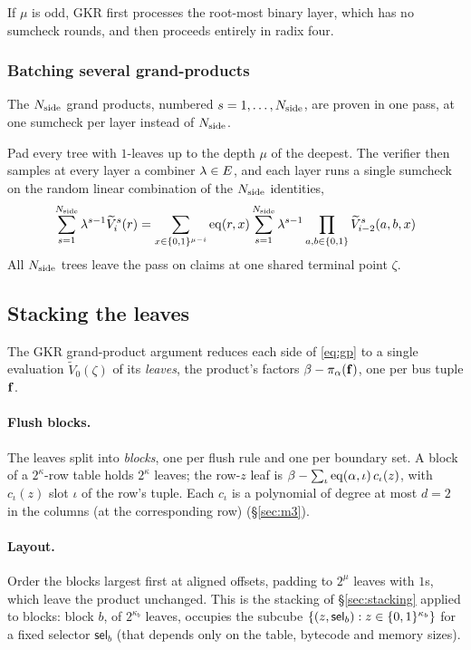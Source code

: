 If $\mu$ is odd, GKR first processes the root-most binary layer, which has no sumcheck rounds, and then proceeds entirely in radix four.

\subsubsection{Batching several grand-products}

The $N_{\mathrm{side}}$ grand products, numbered $s=1,\dots,N_{\mathrm{side}}$, are proven in one pass, at one sumcheck per layer instead of $N_{\mathrm{side}}$.

Pad every tree with $1$-leaves up to the depth $\mu$ of the deepest. The verifier then samples at every layer a combiner $\lambda \in E$, and each layer runs a single sumcheck on the random linear combination of the $N_{\mathrm{side}}$ identities,
\[
\sum_{s=1}^{N_{\mathrm{side}}}\lambda^{s-1}\widetilde V_i^{s}(r)=\sum_{x\in\{0,1\}^{\mu-i}}\operatorname{eq}(r,x)\sum_{s=1}^{N_{\mathrm{side}}}\lambda^{s-1}\prod_{a,b\in\{0,1\}}\widetilde V_{i-2}^{s}(a,b,x)
\]
All $N_{\mathrm{side}}$ trees leave the pass on claims at one shared terminal point $\zeta$.

\subsection{Stacking the leaves}\label{sec:leafstack}

The GKR grand-product argument reduces each side of \eqref{eq:gp} to a single evaluation $\widetilde V_0(\zeta)$ of its \emph{leaves}, the product's factors $\beta-\pi_\alpha(\mathbf{f})$, one per bus tuple $\mathbf{f}$.

\paragraph{Flush blocks.} The leaves split into \emph{blocks}, one per flush rule and one per boundary set. A block of a $2^{\kappa}$-row table holds $2^{\kappa}$ leaves; the row-$z$ leaf is $\beta-\sum_{\iota}\operatorname{eq}(\alpha,\iota)\,c_{\iota}(z)$, with $c_{\iota}(z)$ slot $\iota$ of the row's tuple. Each $c_\iota$ is a polynomial of degree at most $d = 2$ in the columns (at the corresponding row) (\S\ref{sec:m3}).

\paragraph{Layout.} Order the blocks largest first at aligned offsets, padding to $2^{\mu}$ leaves with $1$s, which leave the product unchanged. This is the stacking of \S\ref{sec:stacking} applied to blocks: block $b$, of $2^{\kappa_b}$ leaves, occupies the subcube $\{(z,\mathsf{sel}_b):z\in\{0,1\}^{\kappa_b}\}$ for a fixed selector $\mathsf{sel}_b$ (that depends only on the table, bytecode and memory sizes).


